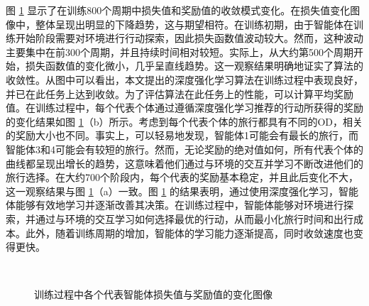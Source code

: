 图 \ref{loss&reward} 显示了在训练800个周期中损失值和奖励值的收敛模式变化。在损失值变化图像中，整体呈现出明显的下降趋势，这与期望相符。在训练初期，由于智能体在训练开始阶段需要对环境进行行动探索，因此损失函数值波动较大。然而，这种波动主要集中在前300个周期，并且持续时间相对较短。实际上，从大约第500个周期开始，损失函数值的变化微小，几乎呈直线趋势。这一观察结果明确地证实了算法的收敛性。从图中可以看出，本文提出的深度强化学习算法在训练过程中表现良好，并已在此任务上达到收敛。为了评估算法在此任务上的性能，可以计算平均奖励值。在训练过程中，每个代表个体通过遵循深度强化学习推荐的行动所获得的奖励的变化结果如图 \ref{loss&reward}（b）所示。考虑到每个代表个体的旅行都具有不同的OD，相关的奖励大小也不同。事实上，可以轻易地发现，智能体1可能会有最长的旅行，而智能体3和4可能会有较短的旅行。然而，无论奖励的绝对值如何，所有代表个体的曲线都呈现出增长的趋势，这意味着他们通过与环境的交互并学习不断改进他们的旅行选择。在大约700个阶段内，每个代表的奖励基本稳定，并且此后变化不大，这一观察结果与图 \ref{loss&reward}（a）一致。图 \ref{loss&reward} 的结果表明，通过使用深度强化学习，智能体能够有效地学习并逐渐改善其决策。在训练过程中，智能体能够对环境进行探索，并通过与环境的交互学习如何选择最优的行动，从而最小化旅行时间和出行成本。此外，随着训练周期的增加，智能体的学习能力逐渐提高，同时收敛速度也变得更快。
\begin{figure}
\centering
  \label{loss}
  \\
  \label{reward}
  \caption{训练过程中各个代表智能体损失值与奖励值的变化图像}
  \label{loss&reward}
\end{figure}

